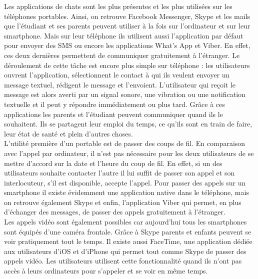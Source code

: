 \documentclass[12pt]{article}
\begin{document}
Les applications de chats sont les plus présentes et les plus utilisées sur les téléphones portables. Ainsi, on retrouve Facebook Messenger, Skype et les mails que l'étudiant et ses parents peuvent utiliser à la fois sur l'ordinateur et sur leur smartphone. Mais sur leur téléphone ils utilisent aussi l'application par défaut pour envoyer des SMS ou encore les applications What's App et Viber. En effet, ces deux dernières permettent de communiquer gratuitement à l'étranger. Le déroulement de cette tâche est encore plus simple sur téléphone : les utilisateurs ouvrent l'application, sélectionnent le contact à qui ils veulent envoyer un message textuel, rédigent le message et l'envoient. L'utilisateur qui reçoit le message est alors averti par un signal sonore, une vibration ou une notification textuelle et il peut y répondre immédiatement ou plus tard. Grâce à ces applications les parents et l'étudiant peuvent communiquer quand ils le souhaitent. Ils se partagent leur emploi du temps, ce qu'ils sont en train de faire, leur état de santé et plein d'autres choses. ~\\
 
L'utilité première d'un portable est de passer des coups de fil. En comparaison avec l'appel par ordinateur, il n'est pas nécessaire pour les deux utilisateurs de se mettre d'accord sur la date et l'heure du coup de fil. En effet, si un des utilisateurs souhaite contacter l'autre il lui suffit de passer son appel et son interlocuteur, s'il est disponible, accepte l'appel. Pour passer des appels sur un smartphone il existe évidemment une application native dans le téléphone,  mais on retrouve également Skype et enfin, l'application Viber qui permet, en plus d'échanger des messages, de passer des appels gratuitement à l'étranger.~\\

Les appels vidéo sont également possibles car aujourd'hui tous les smartphones sont équipés d'une caméra frontale. Grâce à Skype parents et enfants peuvent se voir pratiquement tout le temps. Il existe aussi FaceTime, une application dédiée aux utilisateurs d'iOS et d'iPhone qui permet tout comme Skype de passer des appels vidéo. Les utilisateurs utilisent cette fonctionnalité quand ils n'ont pas accès à leurs ordinateurs pour s'appeler et se voir en même temps.~\\
\end{document}
